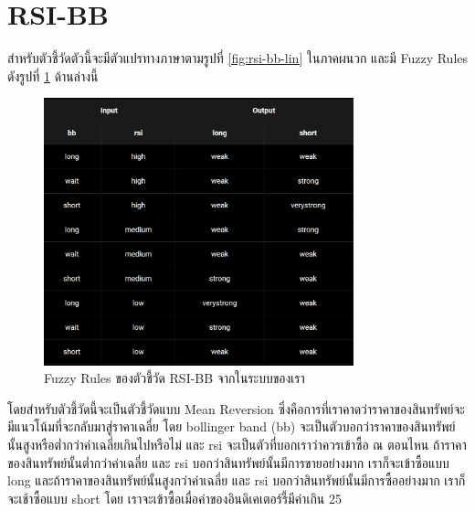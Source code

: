 \section{RSI-BB}
สำหรับตัวชี้วัดตัวนี้จะมีตัวแปรทางภาษาตามรูปที่ \ref{fig:rsi-bb-lin} ในภาคผนวก และมี Fuzzy Rules ดังรูปที่ \ref{fig:rsi-bb-rules} ด้านล่างนี้
\begin{figure}[ht]
    \centering
    \includegraphics[width=0.8\textwidth]{images/rsi-bb-rules.png}
    \caption{Fuzzy Rules ของตัวชี้วัด RSI-BB จากในระบบของเรา}
    \label{fig:rsi-bb-rules}
\end{figure}

โดยสำหรับตัวชี้วัดนี้จะเป็นตัวชี้วัดแบบ Mean Reversion ซึ่งคือการที่เราคาดว่าราคาของสินทรัพย์จะมีแนวโน้มที่จะกลับมาสู่ราคาเฉลี่ย โดย bollinger band (bb) จะเป็นตัวบอกว่าราคาของสินทรัพย์นั้นสูงหรือต่ำกว่าค่าเฉลี่ยเกินไปหรือไม่ และ rsi จะเป็นตัวที่บอกเราว่าควรเข้าซื้อ ณ ตอนไหน ถ้าราคาของสินทรัพย์นั้นต่ำกว่าค่าเฉลี่ย และ rsi บอกว่าสินทรัพย์นั้นมีการขายอย่างมาก เราก็จะเข้าซื้อแบบ long และถ้าราคาของสินทรัพย์นั้นสูงกว่าค่าเฉลี่ย และ rsi บอกว่าสินทรัพย์นั้นมีการซื้ออย่างมาก เราก็จะเช้าซื้อแบบ short โดย เราจะเข้าซื้อเมื่อค่าของอินดิเคเตอร์รี้มีค่าเกิน 25

